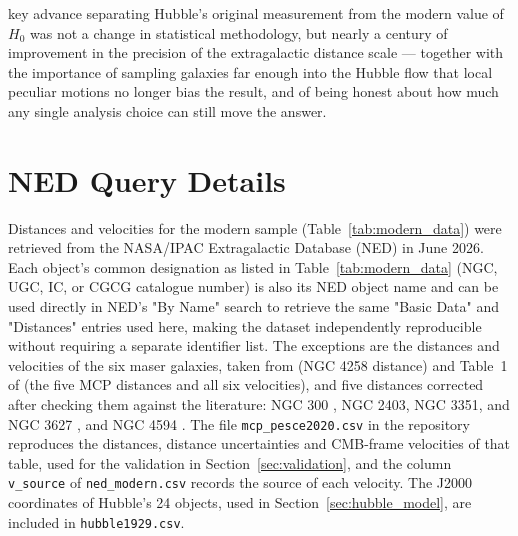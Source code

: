 \documentclass[11pt]{article}
\begin{document}
key advance separating Hubble's original measurement from the modern value of $H_0$ was not a change in statistical methodology, but nearly a century of improvement in the precision of the extragalactic distance scale --- together with the importance of sampling galaxies far enough into the Hubble flow that local peculiar motions no longer bias the result, and of being honest about how much any single analysis choice can still move the answer.
\appendix
\section{NED Query Details}
\label{app:ned}
Distances and velocities for the modern sample (Table~\ref{tab:modern_data}) were retrieved from the NASA/IPAC Extragalactic Database (NED) in June 2026. Each object's common designation as listed in Table~\ref{tab:modern_data} (NGC, UGC, IC, or CGCG catalogue number) is also its NED object name and can be used directly in NED's "By Name" search to retrieve the same "Basic Data" and "Distances" entries used here, making the dataset independently reproducible without requiring a separate identifier list. The exceptions are the distances and velocities of the six maser galaxies, taken from \citet{reid2019} (NGC 4258 distance) and Table~1 of \citet{pesce2020} (the five MCP distances and all six velocities), and five distances corrected after checking them against the literature: NGC 300 \citep{gieren2005}, NGC 2403, NGC 3351, and NGC 3627 \citep{freedman2001}, and NGC 4594 \citep{mcquinn2016}. The file \texttt{mcp\_pesce2020.csv} in the repository reproduces the distances, distance uncertainties and CMB-frame velocities of that table, used for the validation in Section~\ref{sec:validation}, and the column \texttt{v\_source} of \texttt{ned\_modern.csv} records the source of each velocity. The J2000 coordinates of Hubble's 24 objects, used in Section~\ref{sec:hubble_model}, are included in \texttt{hubble1929.csv}.
\end{document}
